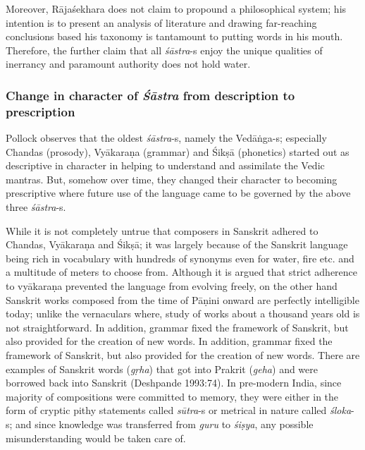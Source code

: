 Moreover, Rājaśekhara does not claim to propound a philosophical system; his intention is to present an analysis of literature and drawing far-reaching conclusions based his taxonomy is tantamount to putting words in his mouth. Therefore, the further claim that all {\sl śāstra}-s enjoy the unique qualities of inerrancy and paramount authority does not hold water.

\subsubsection{Change in character of {{\sl\bfseries Śāstra}\relax} from description to prescription}\label{art12-sec3.4.1}

Pollock observes that the oldest {\sl śāstra}-s, namely the Vedāṅga-s; especially Chandas (prosody), Vyākaraṇa (grammar) and Śikṣā (phonetics) started out as descriptive in character in helping to understand and assimilate the Vedic mantras. But, somehow over time, they changed their character to becoming prescriptive where future use of the language came to be governed by the above three {\sl śāstra}-s.

While it is not completely untrue that composers in Sanskrit adhered to Chandas, Vyākaraṇa and Śikṣā; it was largely because of the Sanskrit language being rich in vocabulary with hundreds of synonyms even for water, ﬁre etc. and a multitude of meters to choose from. Although it is argued that strict adherence to vyākaraṇa prevented the language from evolving freely, on the other hand Sanskrit works composed from the time of Pāṇini onward are perfectly intelligible today; unlike the vernaculars where, study of works about a thousand years old is not straightforward. In addition, grammar ﬁxed the framework of Sanskrit, but also provided for the creation of new words. In addition, grammar fixed the framework of Sanskrit, but also provided for the creation of new words. There are examples of Sanskrit words ({\sl gṛha}) that got into Prakrit ({\sl geha}) and were borrowed back into Sanskrit (Deshpande 1993:74). In pre-modern India, since majority of compositions were committed to memory, they were either in the form of cryptic pithy statements called {\sl sūtra}-s or metrical in nature called {\sl śloka}-s; and since knowledge was transferred from {\sl guru} to {\sl śiṣya}, any possible misunderstanding would be taken care of.

